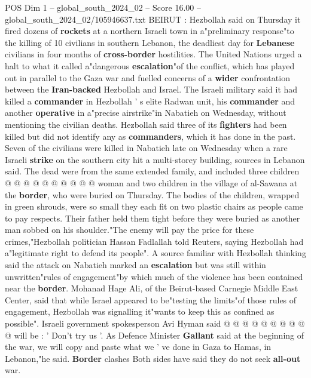 \begin{textsample}{POS Dim 1 – global\_south\_2024\_02 – Score 16.00 – global\_south\_2024\_02/105946637.txt}  \label{ex:f1_pos_210}
BEIRUT : Hezbollah said on Thursday it fired dozens of \textbf{rockets} at a northern Israeli town in a"preliminary response"to the killing of 10 civilians in southern Lebanon, the deadliest day for \textbf{Lebanese} civilians in four months of \textbf{cross-border} hostilities.
The United Nations urged a halt to what it called a"dangerous \textbf{escalation}"of the conflict, which has played out in parallel to the Gaza war and fuelled concerns of a \textbf{wider} confrontation between the \textbf{Iran-backed} Hezbollah and Israel.
The Israeli military said it had killed a \textbf{commander} in Hezbollah ' s elite Radwan unit, his \textbf{commander} and another \textbf{operative} in a"precise airstrike"in Nabatieh on Wednesday, without mentioning the civilian deaths.
Hezbollah said three of its \textbf{fighters} had been killed but did not identify any as \textbf{commanders}, which it has done in the past.
Seven of the civilians were killed in Nabatieh late on Wednesday when a rare Israeli \textbf{strike} on the southern city hit a multi-storey building, sources in Lebanon said.
The dead were from the same extended family, and included three children @ @ @ @ @ @ @ @ @ @ woman and two children in the village of al-Sawana at the \textbf{border}, who were buried on Thursday.
The bodies of the children, wrapped in green shrouds, were so small they each fit on two plastic chairs as people came to pay respects.
Their father held them tight before they were buried as another man sobbed on his shoulder."The enemy will pay the price for these crimes,"Hezbollah politician Hassan Fadlallah told Reuters, saying Hezbollah had a"legitimate right to defend its people".
A source familiar with Hezbollah thinking said the attack on Nabatieh marked an \textbf{escalation} but was still within unwritten"rules of engagement"by which much of the violence has been contained near the \textbf{border}.
Mohanad Hage Ali, of the Beirut-based Carnegie Middle East Center, said that while Israel appeared to be"testing the limits"of those rules of engagement, Hezbollah was signalling it"wants to keep this as confined as possible".
Israeli government spokesperson Avi Hyman said @ @ @ @ @ @ @ @ @ @ will be : ' Don't try us '.
As Defence Minister \textbf{Gallant} said at the beginning of the war, we will copy and paste what we ' ve done in Gaza to Hamas, in Lebanon,"he said. \textbf{Border} clashes Both sides have said they do not seek \textbf{all-out} war.

\end{textsample}
